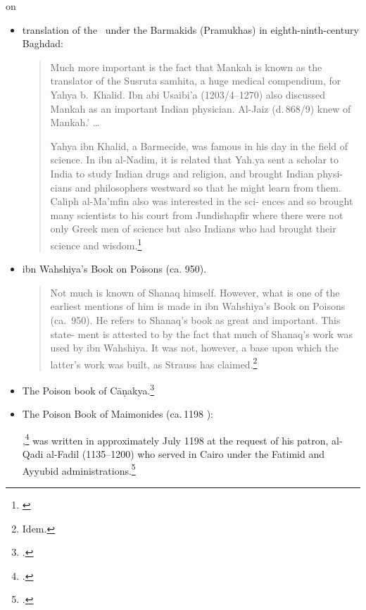 \citet[Introduction]{leve-1966} on 
\begin{itemize}
    \item translation of the \SS\ under the Barmakids (Pramukhas) in 
    eighth-ninth-century Baghdad:
    \begin{quote}
        Much more important is the fact
        that Mankah is known as the translator of the Susruta
        samhita, a huge medical compendium, for Yahya b.~Khalid. Ibn abi Usaibi'a 
        (1203/4--1270) also discussed
        Mankah as an important Indian physician. Al-Jaiz
        (d.\,868/9) knew of Mankah.'
        \ldots
        
        Yahya ibn Khalid, a Barmecide, was famous in his
        day in the field of science. In ibn al-Nadim, it is
        related that Yah.ya sent a scholar to India to study
        Indian drugs and religion, and brought Indian physi-
        cians and philosophers westward so that he might learn
        from them.
        Caliph al-Ma'mfin  also was interested in the sci-
        ences and so brought many scientists to his court from
        Jundishapfir where there were not only Greek men of
        science but also Indians who had brought their science
        and wisdom.\footnote{\cite[6]{leve-1966}}
    \end{quote}
    
    \item ibn Wahshiya's Book on Poisons (ca. 950). 
    \begin{quote}
        Not much is known of Shanaq himself. However,
        what is one of the earliest mentions of him is made in
        ibn Wahshiya's Book on Poisons (ca.\ 950). He refers
        to Shanaq's book as great and important. This state-
        ment is attested to by the fact that much of Shanaq's
        work was used by ibn Wahshiya. It was not, however,
        a base upon which the latter's work was built, as
        Strauss has claimed.\footnote{Idem.}
    \end{quote}
    \item The Poison book of Cāṇakya.\footcite{stra-1934}

\item The Poison Book of Maimonides (ca.\,1198 \CE):

,\footcite{rosn-1968}  was written in
approximately July 1198 at the request of his patron, al-Qadi
al-Fadil (1135--1200) who served in Cairo under the Fatimid and
Ayyubid administrations.\footcite[31]{krae-2005}
\end{itemize}
